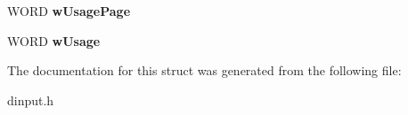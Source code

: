 \begin{DoxyCompactItemize}
\item 
\hypertarget{struct_d_i_d_e_v_i_c_e_i_n_s_t_a_n_c_e_a_a02b8b39330eccedddfa3b965583d7d65}{W\-O\-R\-D {\bfseries w\-Usage\-Page}}\label{struct_d_i_d_e_v_i_c_e_i_n_s_t_a_n_c_e_a_a02b8b39330eccedddfa3b965583d7d65}

\item 
\hypertarget{struct_d_i_d_e_v_i_c_e_i_n_s_t_a_n_c_e_a_a0f1928849f72830a408a9b4e15313e56}{W\-O\-R\-D {\bfseries w\-Usage}}\label{struct_d_i_d_e_v_i_c_e_i_n_s_t_a_n_c_e_a_a0f1928849f72830a408a9b4e15313e56}

\end{DoxyCompactItemize}


The documentation for this struct was generated from the following file\-:\begin{DoxyCompactItemize}
\item 
dinput.\-h\end{DoxyCompactItemize}
